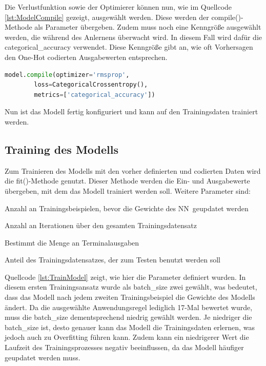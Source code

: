 Die Verlustfunktion sowie der Optimierer können nun, wie im Quellcode \ref*{lst:ModelCompile} gezeigt, ausgewählt werden. Diese werden der compile()-Methode als Parameter übergeben.
Zudem muss noch eine Kenngröße ausgewählt werden, die während des Anlernens überwacht wird. In diesem Fall wird dafür die \glqq categorical\_accuracy\grqq{} verwendet.
Diese Kenngröße gibt an, wie oft Vorhersagen den One-Hot codierten Ausgabewerten entsprechen.

\begin{lstlisting}[language = python, caption={Auswahl des Optimierers sowie der Verlustfunktion},captionpos=b, label = lst:ModelCompile, float, floatplacement=H]
    model.compile(optimizer='rmsprop',
        loss=CategoricalCrossentropy(),
        metrics=['categorical_accuracy'])
\end{lstlisting}

Nun ist das Modell fertig konfiguriert und kann auf den Trainingsdaten trainiert werden.

\subsection{Training des Modells}
\label{chap:TrainNN}

Zum Trainieren des Modells mit den vorher definierten und codierten Daten wird die fit()-Methode genutzt. Dieser Methode werden die Ein- und Ausgabewerte übergeben, mit dem das Modell trainiert werden soll.
Weitere Parameter sind:
\begin{description}[style=multiline,leftmargin=4cm,font=\bfseries, nolistsep]
    \item[batch\_size] Anzahl an Trainingsbeispielen, bevor die Gewichte des \ac{NN}~geupdatet werden \cite{KerasDoc}
    \item[epochs] Anzahl an Iterationen über den gesamten Trainingsdatensatz \cite{KerasDoc}
    \item[verbose] Bestimmt die Menge an Terminalausgaben \cite{KerasDoc}
    \item[validation\_split] Anteil des Trainingsdatensatzes, der zum Testen benutzt werden soll \cite{KerasDoc}
\end{description} 
Quellcode \ref*{lst:TrainModel} zeigt, wie hier die Parameter definiert wurden. In diesem ersten Trainingsansatz wurde als \glqq batch\_size\grqq{} zwei gewählt, was bedeutet, dass das Modell
nach jedem zweiten Trainingsbeispiel die Gewichte des Modells ändert. Da die ausgewählte Anwendungsregel lediglich 17-Mal bewertet wurde, muss die \glqq batch\_size\grqq{} dementsprechend niedrig gewählt
werden. Je niedriger die \glqq batch\_size\grqq{} ist, desto genauer kann das Modell die Trainingsdaten erlernen, was jedoch auch zu Overfitting führen kann. Zudem kann ein niedrigerer Wert 
die Laufzeit des Trainingsprozesses negativ beeinflussen, da das Modell häufiger geupdatet werden muss.

